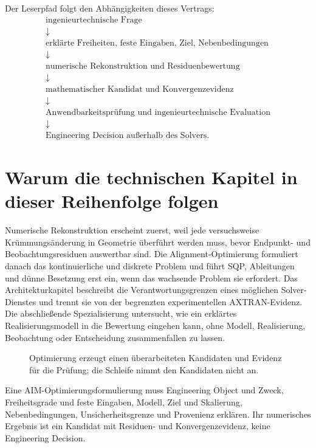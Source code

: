 Der Leserpfad folgt den Abhängigkeiten dieses Vertrags:
\[
\begin{array}{c}
\text{ingenieurtechnische Frage}\\
\downarrow\\
\text{erklärte Freiheiten, feste Eingaben, Ziel, Nebenbedingungen}\\
\downarrow\\
\text{numerische Rekonstruktion und Residuenbewertung}\\
\downarrow\\
\text{mathematischer Kandidat und Konvergenzevidenz}\\
\downarrow\\
\text{Anwendbarkeitsprüfung und ingenieurtechnische Evaluation}\\
\downarrow\\
\text{Engineering Decision außerhalb des Solvers.}
\end{array}
\]

\section*{Warum die technischen Kapitel in dieser Reihenfolge folgen}

Numerische Rekonstruktion erscheint zuerst, weil jede versuchsweise
Krümmungsänderung in Geometrie überführt werden muss, bevor Endpunkt- und
Beobachtungsresiduen auswertbar sind. Die Alignment-Optimierung formuliert
danach das kontinuierliche und diskrete Problem und führt SQP, Ableitungen und
dünne Besetzung erst ein, wenn das wachsende Problem sie erfordert. Das
Architekturkapitel beschreibt die Verantwortungsgrenzen eines möglichen
Solver-Dienstes und trennt sie von der begrenzten experimentellen
AXTRAN-Evidenz. Die abschließende Spezialisierung untersucht, wie ein erklärtes
Realisierungsmodell in die Bewertung eingehen kann, ohne Modell, Realisierung,
Beobachtung oder Entscheidung zusammenfallen zu lassen.

\begin{figure}[ht]
\centering

\caption{Optimierung erzeugt einen überarbeiteten Kandidaten und Evidenz für die Prüfung; die Schleife nimmt den Kandidaten nicht an.}
\label{fig:icon-optimization-evaluation-loop}
\end{figure}

\begin{principle}[Optimierungsprinzip]
\label{princ:optimization-principle}
Eine AIM-Optimierungsformulierung muss Engineering Object und Zweck,
Freiheitsgrade und feste Eingaben, Modell, Ziel und Skalierung,
Nebenbedingungen, Unsicherheitsgrenze und Provenienz erklären. Ihr numerisches
Ergebnis ist ein Kandidat mit Residuen- und Konvergenzevidenz, keine
Engineering Decision.
\end{principle}

